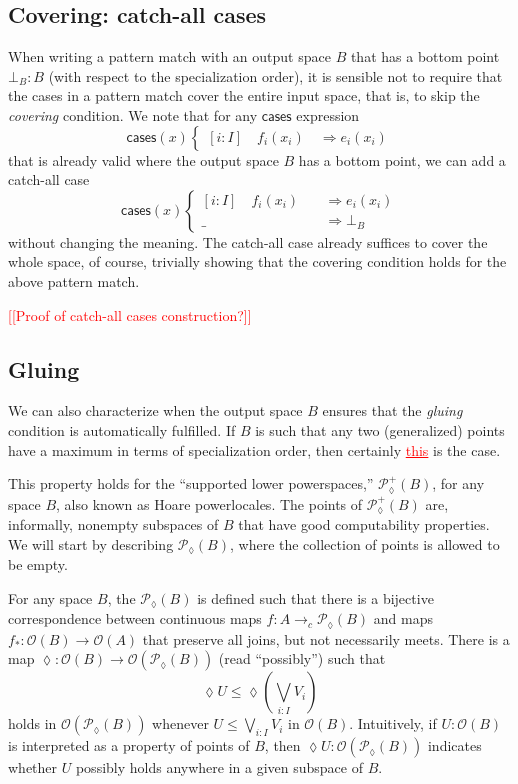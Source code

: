 \documentclass[conference]{IEEEtran}
\newcommand{\PLower}{\mathcal{P}_\lozenge}
\newcommand{\cto}{\to_c}
\newcommand{\Open}[1]{\mathcal{O}({#1})}
\newcommand{\wildcard}{\_}
\newcommand{\Branch}{\Rightarrow}
\newcommand{\note}[1]{\textcolor{red}{[[{#1}]]}}
\newcommand{\grammar}[1]{\textcolor{red}{\underline{#1}}}
\begin{document}
\subsection{Covering: catch-all cases}

When writing a pattern match with an output space $B$ that has a bottom point $\bot_B : B$ (with respect to the specialization order), it is sensible not to require that the cases in a pattern match cover the entire input space, that is, to skip the \emph{covering} condition. We note that for any $\mathsf{cases}$ expression
\[
\mathsf{cases}(x)
\begin{cases}
[i : I] \quad f_i(x_i) \quad \Branch e_i(x_i)
\end{cases}
\]
that is already valid where the output space $B$ has a bottom point, we can add a catch-all case
\[
\mathsf{cases}(x)
\begin{cases}
[i : I] \quad f_i(x_i) \quad &\Branch e_i(x_i)
\\ \wildcard \quad &\Branch \bot_B
\end{cases}
\]
without changing the meaning. The catch-all case already suffices to cover the whole space, of course, trivially showing that the covering condition holds for the above pattern match.

\note{Proof of catch-all cases construction?}

\subsection{Gluing}

We can also characterize when the output space $B$ ensures that the \emph{gluing} condition is automatically fulfilled. If $B$ is such that any two (generalized) points have a maximum in terms of specialization order, then certainly \grammar{this} is the case.

This property holds for the ``supported lower powerspaces,'' $\PLower^+(B)$, for any space $B$, also known as Hoare powerlocales. The points of $\PLower^+(B)$ are, informally, nonempty subspaces of $B$ that have good computability properties. We will start by describing $\PLower(B)$, where the collection of points is allowed to be empty.

For any space $B$, the $\PLower(B)$ is defined such that there is a bijective correspondence between continuous maps $f : A \cto \PLower(B)$ and maps $f_* : \Open{B} \to \Open{A}$ that preserve all joins, but not necessarily meets. There is a map $\lozenge : \Open{B} \to \Open{\PLower(B)}$ (read ``possibly'') such that
\[
\lozenge U \le \lozenge \left( \bigvee_{i : I} V_i \right)
\]
holds in $\Open{\PLower(B)}$ whenever $U \le \bigvee_{i : I} V_i$ in $\Open{B}$. Intuitively, if $U : \Open{B}$ is interpreted as a property of points of $B$, then $\lozenge U : \Open{\PLower(B)}$ indicates whether $U$ possibly holds anywhere in a given subspace of $B$.
\end{document}
